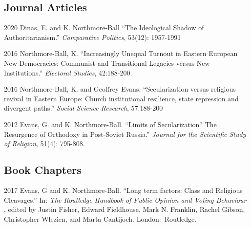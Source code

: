 \documentclass[12pt,letterpaper]{report}
\begin{document}
    \subsection*{Journal Articles}

    \begin{tablist}

        \item[2020] \tab{}Dinas, E. and K. Northmore-Ball \enquote{The Ideological Shadow of Authoritarianism.} \textit{Comparative Politics}, 53(12): 1957-1991 %
        
         \item[2016] \tab{}Northmore-Ball, K. \enquote{Increasingly Unequal Turnout in Eastern European New Democracies: Communist and Transitional Legacies versus New Institutions.} \textit{Electoral Studies}, 42:188-200. %
         
         \item[2016] \tab{}Northmore-Ball, K. and Geoffrey Evans. \enquote{Secularization versus religious revival in Eastern Europe: Church institutional resilience, state repression and divergent paths.} \textit{Social Science Research}, 57:188-200 
         
         \item[2012] \tab{}Evans, G. and K. Northmore-Ball. \enquote{Limits of Secularization? The Resurgence of Orthodoxy in Post-Soviet Russia.} \textit{Journal for the Scientific Study of Religion}, 51(4): 795-808.  


    \end{tablist}
%
%
%
    \subsection*{Book Chapters}

   \begin{tablist}
%
       \item[2017] \tab{}Evans, G and K. Northmore-Ball. \enquote{Long term factors: Class and Religious Cleavages.} In: \textit{The Routledge Handbook of Public Opinion and Voting Behaviour }, edited by Justin Fisher, Edward Fieldhouse, Mark N. Franklin, Rachel Gibson, Christopher Wlezien, and Marta Cantijoch. London:\ Routledge. 

    \end{tablist}
\end{document}
